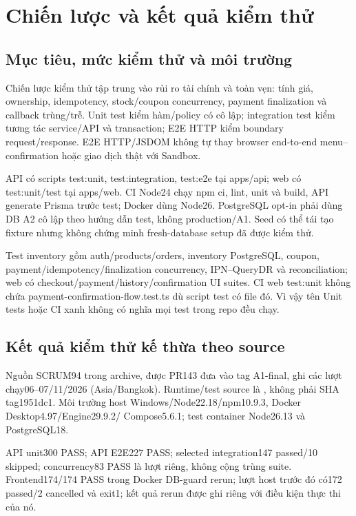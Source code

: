 \section{Chiến lược và kết quả kiểm thử}
\label{sec:a2-implementation-tests}
\subsection{Mục tiêu, mức kiểm thử và môi trường}
Chiến lược kiểm thử tập trung vào rủi ro tài chính và toàn vẹn: tính giá,
ownership, idempotency, stock/coupon concurrency, payment finalization và
callback trùng/trễ. Unit test kiểm hàm/policy có cô lập; integration test kiểm
tương tác service/API và transaction; E2E HTTP kiểm boundary request/response.
E2E HTTP/JSDOM không tự thay browser end-to-end menu--confirmation hoặc giao
dịch thật với Sandbox.

API có scripts test:unit, test:integration, test:e2e tại apps/api; web có
test:unit/test tại apps/web. CI Node24 chạy npm ci, lint, unit và build, API
generate Prisma trước test; Docker dùng Node26. PostgreSQL opt-in phải dùng
DB A2 cô lập theo hướng dẫn test, không production/A1. Seed có thể tái tạo fixture nhưng
không chứng minh fresh-database setup đã được kiểm thử.

Test inventory gồm auth/products/orders, inventory PostgreSQL, coupon,
payment/idempotency/finalization concurrency, IPN--QueryDR và reconciliation;
web có checkout/payment/history/confirmation UI suites. CI web test:unit
không chứa payment-confirmation-flow.test.ts dù script test có file đó.
Vì vậy tên Unit tests hoặc CI xanh không có nghĩa mọi test trong repo đều chạy.

\subsection{Kết quả kiểm thử kế thừa theo source}
Nguồn SCRUM94 trong archive, được PR143 đưa vào tag A1-final, ghi các lượt
chạy06--07/11/2026 (Asia/Bangkok). Runtime/test source là
, không phải SHA tag1951dc1.
Môi trường host Windows/Node22.18/npm10.9.3, Docker Desktop4.97/Engine29.9.2/
Compose5.6.1; test container Node26.13 và PostgreSQL18.

API unit300 PASS; API E2E227 PASS; selected integration147 passed/10 skipped;
concurrency83 PASS là lượt riêng, không cộng trùng suite. Frontend174/174
PASS trong Docker DB-guard rerun; lượt host trước đó có172 passed/2 cancelled
và exit1; kết quả rerun được ghi riêng với điều kiện thực thi của nó.

